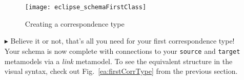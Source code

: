 \begin{itemize}
\begin{figure}[htbp]
\begin{center}
  \texttt{[image: eclipse\_schemaFirstClass]}
  \caption{Creating a correspondence type}
  \label{eclipse:firstCorrType}
\end{center}
\end{figure}

\item[$\blacktriangleright$] Believe it or not, that's all you need for your first correspondence type! Your schema is now complete with connections to your
\texttt{source} and \texttt{target} metamodels via a \emph{link} metamodel. To see the equivalent structure in the visual syntax, check out
Fig.~\ref{ea:firstCorrType} from the previous section.

\end{itemize}
